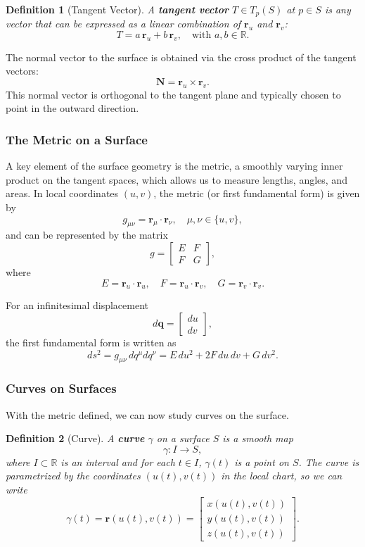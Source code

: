 \documentclass[12pt]{article}
\newcommand{\R}{\mathbb{R}}
\newtheorem{definition}{Definition}[section]
\begin{document}
\begin{definition}[Tangent Vector]
A \textbf{tangent vector} $T \in T_{p}(S)$ at $p \in S$ is any vector that can be expressed as a linear combination of $\mathbf{r}_u$ and $\mathbf{r}_v$:
\[
    T = a\, \mathbf{r}_u + b\, \mathbf{r}_v, \quad \text{with } a,b\in \R.
\]
\end{definition}

The normal vector to the surface is obtained via the cross product of the tangent vectors:
\[
    \mathbf{N} = \mathbf{r}_u \times \mathbf{r}_v.
\]
This normal vector is orthogonal to the tangent plane and typically chosen to point in the outward direction.

\subsubsection{The Metric on a Surface}

A key element of the surface geometry is the metric, a smoothly varying inner product on the tangent spaces, which allows us to measure lengths, angles, and areas. In local coordinates $(u,v)$, the metric (or first fundamental form) is given by
\[
    g_{\mu\nu} = \mathbf{r}_\mu \cdot \mathbf{r}_\nu, \quad \mu,\nu \in \{u,v\},
\]
and can be represented by the matrix
\[
    g = \begin{bmatrix} E & F \\ F & G \end{bmatrix},
\]
where
\[
    E = \mathbf{r}_u \cdot \mathbf{r}_u,\quad F = \mathbf{r}_u \cdot \mathbf{r}_v,\quad G = \mathbf{r}_v \cdot \mathbf{r}_v.
\]

For an infinitesimal displacement
\[
    d\mathbf{q} = \begin{bmatrix} du \\ dv \end{bmatrix},
\]
the first fundamental form is written as
\[
    ds^2 = g_{\mu\nu}\, dq^\mu dq^\nu = E\, du^2 + 2F\, du\, dv + G\, dv^2.
\]

\subsubsection{Curves on Surfaces}

With the metric defined, we can now study curves on the surface.

\begin{definition}[Curve]
A \textbf{curve} $\gamma$ on a surface $S$ is a smooth map
\[
    \gamma : I \to S,
\]
where $I \subset \R$ is an interval and for each $t\in I$, $\gamma(t)$ is a point on $S$.
The curve is parametrized by the coordinates $(u(t), v(t))$ in the local chart, so we can write
\[
    \gamma(t) = \mathbf{r}(u(t), v(t)) = \begin{bmatrix} x(u(t), v(t)) \\ y(u(t), v(t)) \\ z(u(t), v(t)) \end{bmatrix}.
\]
\end{definition}
\end{document}
